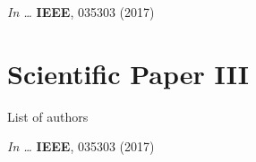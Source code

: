 \noindent \textit{In \Proc \IntlConf \ldots} \textbf{IEEE}, 035303 (2017)
\cleardoublepage



\renewcommand{\boxsizept}{56pt}
\chapter{Scientific Paper III}
\thispagestyle{empty}

\noindent List of authors\vspace{3ex}

\noindent \textit{In \Proc \IntlConf \ldots} \textbf{IEEE}, 035303 (2017)
\cleardoublepage

%
